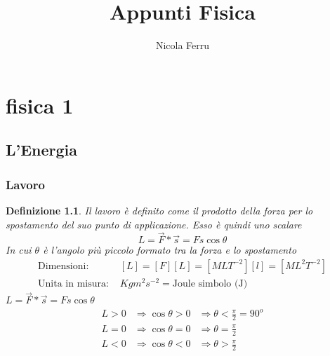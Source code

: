 \documentclass{book}
\title{Appunti Fisica}
\author{Nicola Ferru}
\date{}
\newtheorem{defi}{Definizione}
\begin{document}
\maketitle
\tableofcontents
\listoftables
\listoffigures


\part{fisica 1}

\chapter{L'Energia}
\section{Lavoro}
\begin{defi}
	Il lavoro è definito come il prodotto della forza per lo spostamento del
	suo punto di applicazione. Esso è quindi uno scalare
	\begin{equation}
		L=\vec{F}*\vec{s}=Fs\cos \theta
	\end{equation}
	In cui $\theta$ è l'angolo più piccolo formato tra la forza e lo
	spostamento
	\begin{equation*}
		\begin{matrix}
			\text{Dimensioni: } & [L]=[F][L]=[MLT^{-2}][l]=[ML^2T^{-2}]\\
			\text{Unita in misura: } & Kg m^2 s^{-2} = \text{Joule simbolo (J)}
		\end{matrix}
	\end{equation*}
	$L=\vec{F}*\vec{s}=Fs\cos\theta$
	\begin{equation*}
		\begin{matrix}
			L>0 &\Rightarrow \cos \theta>0 &\Rightarrow \theta < \frac{\pi}{2}=90^o\\
			L=0 &\Rightarrow \cos \theta=0 &\Rightarrow \theta =
			\frac{\pi}{2}\\
			L<0& \Rightarrow \cos \theta <0 & \Rightarrow \theta > \frac{\pi}{2}
		\end{matrix}
	\end{equation*}
\end{defi}
\end{document}
